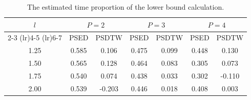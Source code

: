 \begin{table}[ht] %
\centering
\caption{The estimated time proportion of the lower bound calculation.}
\setlength{\tabcolsep}{6pt} %
\begin{tabular}{c cc cc cc}
\toprule
\multirow{2}{*}{$l$} & \multicolumn{2}{c}{$P=2$} & \multicolumn{2}{c}{$P=3$} & \multicolumn{2}{c}{$P=4$} \\
\cmidrule(lr){2-3} \cmidrule(lr){4-5} \cmidrule(lr){6-7}
 & PSED & PSDTW & PSED & PSDTW & PSED & PSDTW \\
\midrule
1.25 & 0.585 & 0.106 & 0.475 & 0.099 & 0.448 & 0.130 \\
1.50 & 0.565 & 0.128 & 0.464 & 0.083 & 0.305 & 0.073 \\
1.75 & 0.540 & 0.074 & 0.438 & 0.033 & 0.302 & -0.110 \\
2.00 & 0.539 & -0.203 & 0.446 & 0.018 & 0.408 & 0.003 \\
\bottomrule
\end{tabular}
\label{tab:time_proportion_lb}
\end{table}

